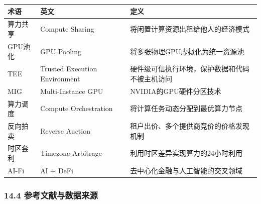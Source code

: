 \documentclass[UTF8,a4paper,12pt]{ctexart}
\begin{document}
{\def\LTcaptype{none} %
\begin{longtable}[]{@{}
  >{\raggedright\arraybackslash}p{}
  >{\raggedright\arraybackslash}p{}
  >{\raggedright\arraybackslash}p{}@{}}
\toprule\noalign{}
\begin{minipage}[b]{\linewidth}\raggedright
术语
\end{minipage} & \begin{minipage}[b]{\linewidth}\raggedright
英文
\end{minipage} & \begin{minipage}[b]{\linewidth}\raggedright
定义
\end{minipage} \\
\midrule\noalign{}
\endhead
\bottomrule\noalign{}
\endlastfoot
算力共享 & Compute Sharing & 将闲置计算资源出租给他人的经济模式 \\
GPU池化 & GPU Pooling & 将多张物理GPU虚拟化为统一资源池 \\
TEE & Trusted Execution Environment &
硬件级可信执行环境，保护数据和代码不被主机访问 \\
MIG & Multi-Instance GPU & NVIDIA的GPU硬件分区技术 \\
算力调度 & Compute Orchestration & 将计算任务动态分配到最优算力节点 \\
反向拍卖 & Reverse Auction & 租户出价、多个提供商竞价的价格发现机制 \\
时区套利 & Timezone Arbitrage & 利用时区差异实现算力的24小时利用 \\
AI-Fi & AI + DeFi & 去中心化金融与人工智能的交叉领域 \\
\end{longtable}
}

\subsubsection{14.4
参考文献与数据来源}\label{ux53c2ux8003ux6587ux732eux4e0eux6570ux636eux6765ux6e90}
\end{document}
